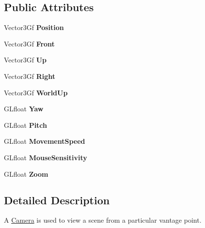 \subsection*{Public Attributes}
\begin{DoxyCompactItemize}
\item 
\mbox{\label{classCamera_ab24ae04e34fbcc1057be0ccca9ce5d76}} 
Vector3\+Gf {\bfseries Position}
\item 
\mbox{\label{classCamera_a7ead2f5965525cc388b16baaf7730e2b}} 
Vector3\+Gf {\bfseries Front}
\item 
\mbox{\label{classCamera_a034f566309116c5e31bf31fc3ae668a5}} 
Vector3\+Gf {\bfseries Up}
\item 
\mbox{\label{classCamera_ab720984bfc18071ec793fceb0174f6e5}} 
Vector3\+Gf {\bfseries Right}
\item 
\mbox{\label{classCamera_a37ce2216fcfd5a5f58913ebd320981aa}} 
Vector3\+Gf {\bfseries World\+Up}
\item 
\mbox{\label{classCamera_abf27283ca0ccc51bae8446796ffc6b44}} 
G\+Lfloat {\bfseries Yaw}
\item 
\mbox{\label{classCamera_ae6afc2507f67baf4390405cfda1d1e87}} 
G\+Lfloat {\bfseries Pitch}
\item 
\mbox{\label{classCamera_a93ea63669df9617a6f63fa09e74a01a9}} 
G\+Lfloat {\bfseries Movement\+Speed}
\item 
\mbox{\label{classCamera_adc61747052dc386a4ab8e110a1fbc628}} 
G\+Lfloat {\bfseries Mouse\+Sensitivity}
\item 
\mbox{\label{classCamera_a1078d85d2e18bdc32291aabfcdda710a}} 
G\+Lfloat {\bfseries Zoom}
\end{DoxyCompactItemize}


\subsection{Detailed Description}
A \hyperlink{classCamera}{Camera} is used to view a scene from a particular vantage point. 

